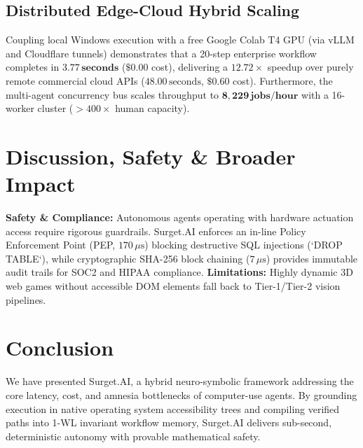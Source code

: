 \documentclass[10pt]{article}
\begin{document}
\subsection{Distributed Edge-Cloud Hybrid Scaling}
Coupling local Windows execution with a free Google Colab T4 GPU (via vLLM and Cloudflare tunnels) demonstrates that a 20-step enterprise workflow completes in $\mathbf{3.77\,\text{seconds}}$ ($\$0.00$ cost), delivering a $\mathbf{12.72\times}$ speedup over purely remote commercial cloud APIs ($48.00\,\text{seconds}$, $\$0.60$ cost). Furthermore, the multi-agent concurrency bus scales throughput to $\mathbf{8,229\,\text{jobs/hour}}$ with a 16-worker cluster ($>400\times$ human capacity).

\section{Discussion, Safety \& Broader Impact}
\label{sec:discussion}
\textbf{Safety & Compliance:} Autonomous agents operating with hardware actuation access require rigorous guardrails. Surget.AI enforces an in-line Policy Enforcement Point (PEP, $170\,\mu\text{s}$) blocking destructive SQL injections (`DROP TABLE`), while cryptographic SHA-256 block chaining ($7\,\mu\text{s}$) provides immutable audit trails for SOC2 and HIPAA compliance. \textbf{Limitations:} Highly dynamic 3D web games without accessible DOM elements fall back to Tier-1/Tier-2 vision pipelines.

\section{Conclusion}
\label{sec:conclusion}
We have presented Surget.AI, a hybrid neuro-symbolic framework addressing the core latency, cost, and amnesia bottlenecks of computer-use agents. By grounding execution in native operating system accessibility trees and compiling verified paths into 1-WL invariant workflow memory, Surget.AI delivers sub-second, deterministic autonomy with provable mathematical safety.



\end{document}
